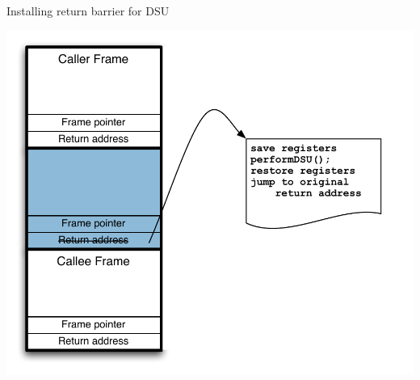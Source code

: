 \begin{frame}{Installing return barrier for DSU}%
\vspace*{-2mm}%
\begin{center}\includegraphics[scale=0.62]{images/stack-smash/return-barrier-overview}\end{center}
\end{frame}

